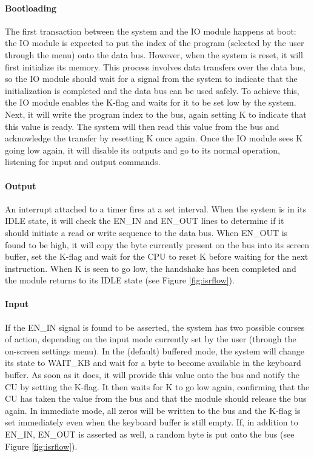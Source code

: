 \paragraph{Bootloading} The first transaction between the system and the IO module happens at boot: the IO module is expected to put the index of the program (selected by the user through the menu) onto the data bus. However, when the system is reset, it will first initialize its memory. This process involves data transfers over the data bus, so the IO module should wait for a signal from the system to indicate that the initialization is completed and the data bus can be used safely. To achieve this, the IO module enables the K-flag and waits for it to be set low by the system. Next, it will write the program index to the bus, again setting K to indicate that this value is ready. The system will then read this value from the bus and acknowledge the transfer by resetting K once again. Once the IO module sees K going low again, it will disable its outputs and go to its normal operation, listening for input and output commands.

\paragraph{Output} An interrupt attached to a timer fires at a set interval. When the system is in its IDLE state, it will check the EN\_IN and EN\_OUT lines to determine if it should initiate a read or write sequence to the data bus. When EN\_OUT is found to be high, it will copy the byte currently present on the bus into its screen buffer, set the K-flag and wait for the CPU to reset K before waiting for the next instruction. When K is seen to go low, the handshake has been completed and the module returns to its IDLE state (see Figure \ref{fig:isrflow}).

\paragraph{Input} If the EN\_IN signal is found to be asserted, the system has two possible courses of action, depending on the input mode currently set by the user (through the on-screen settings menu). In the (default) buffered mode, the system will change its state to WAIT\_KB and wait for a byte to become available in the keyboard buffer. As soon as it does, it will provide this value onto the bus and notify the CU by setting the K-flag. It then waits for K to go low again, confirming that the CU has taken the value from the bus and that the module should release the bus again. In immediate mode, all zeros will be written to the bus and the K-flag is set immediately even when the keyboard buffer is still empty. If, in addition to EN\_IN, EN\_OUT is asserted as well, a random byte is put onto the bus (see Figure \ref{fig:isrflow}).

